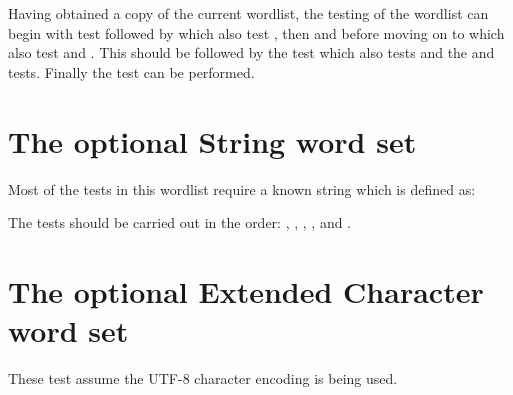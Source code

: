 Having obtained a copy of the current wordlist, the testing of the
wordlist can begin with test  followed
by  which also test , then
\linebreak
{} and  before moving on to
 which also test  and
.  This should be followed by the test
\linebreak
{} which also tests  and the
 and  tests.
Finally the  test can be performed.




\section{The optional String word set} %

Most of the tests in this wordlist require a known string which is
defined as:


The tests should be carried out in the order:
,
, \linebreak
{},
,
 and \linebreak
{}.



\section{The optional Extended Character word set} %

These test assume the UTF-8 character encoding is being used.





\endinput %

